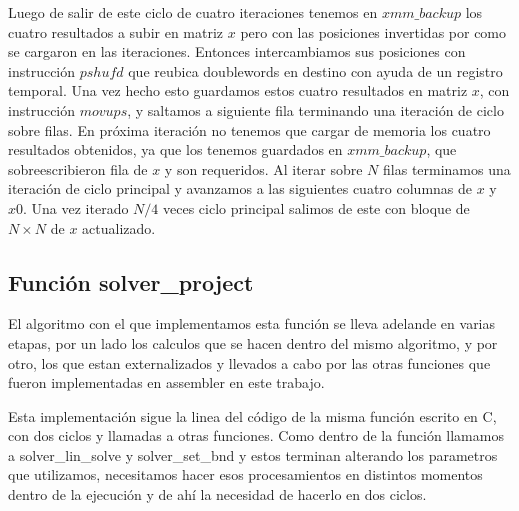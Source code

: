 \par Luego de salir de este ciclo de cuatro iteraciones tenemos en $xmm\_backup$ los cuatro resultados a subir en matriz $x$ pero con las posiciones invertidas por como se cargaron en las iteraciones. Entonces intercambiamos sus posiciones con instrucción $pshufd$ que reubica doublewords en destino con ayuda de un registro temporal. Una vez hecho esto guardamos estos cuatro resultados en matriz $x$, con instrucción $movups$, y saltamos a siguiente fila terminando una iteración de ciclo sobre filas. En próxima iteración no tenemos que cargar de memoria los cuatro resultados obtenidos, ya que los tenemos guardados en $xmm\_backup$, que sobreescribieron fila de $x$ y son requeridos. Al iterar sobre $N$ filas terminamos una iteración de ciclo principal y avanzamos a las siguientes cuatro columnas de $x$ y $x0$. Una vez iterado $N/4$ veces ciclo principal salimos de este con bloque de 
$N\times N$ de $x$ actualizado.\newline

\subsection{Función solver\_project}
\par El algoritmo con el que implementamos esta función se lleva adelande en varias etapas, por un lado los calculos que se hacen dentro del mismo algoritmo, y por otro, los que estan externalizados y llevados a cabo por las otras funciones que fueron implementadas en assembler en este trabajo.\newline

\par Esta implementación sigue la linea del código de la misma función escrito en C, con dos ciclos y llamadas a otras funciones. Como dentro de la función llamamos a solver\_lin\_solve y solver\_set\_bnd y estos terminan alterando los parametros que utilizamos, necesitamos hacer esos procesamientos en distintos momentos dentro de la ejecución y de ahí la necesidad de hacerlo en dos ciclos.\newline

